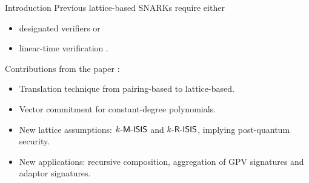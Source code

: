 \begin{frame}{Introduction}
	Previous lattice-based SNARKs require either \pause
	\begin{itemize}
		\item designated verifiers \cite{GennaroMNO18, IshaiSW21} or \pause
		\item linear-time verification \cite{AttemaCK21, BootleCS21}.\pause
	\end{itemize}

	Contributions from the paper \cite{AlbrechtCLMT22}:\pause
	\begin{itemize}
		\item Translation technique from pairing-based to lattice-based.\pause
		\item Vector commitment for constant-degree polynomials.\pause
		\item New lattice assumptions: $k\textsf{-M-ISIS}$ and $k\textsf{-R-ISIS}$, implying post-quantum security.\pause
		\item New applications: recursive composition, aggregation of GPV signatures and adaptor signatures.
	\end{itemize}
\end{frame}